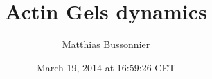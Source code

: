 \documentclass[A4paperpaper,11pt,english]{sphinxmanual}
\title{Actin Gels dynamics}
\date{March 19, 2014 at 16:59:26 CET}
\author{Matthias Bussonnier}
\begin{document}
\maketitle

\tableofcontents
\cleardoublepage
\pagestyle{normal}
 
\label{index-latex::doc}
\end{document}
